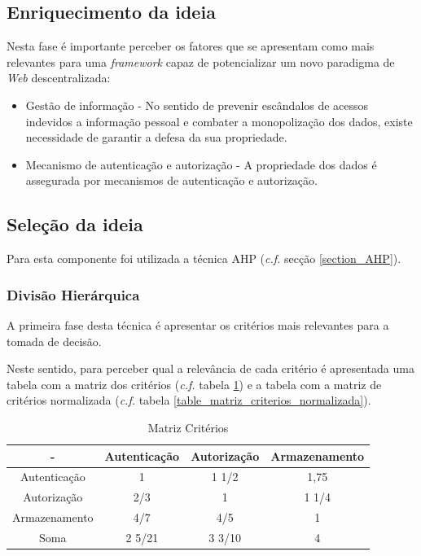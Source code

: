 \subsection{Enriquecimento da ideia}
Nesta fase é importante perceber os fatores que se apresentam como mais relevantes para uma \emph{framework} capaz de potencializar um novo paradigma de \emph{Web} descentralizada:
\begin{itemize}
\item  Gestão de informação - No sentido de prevenir escândalos de acessos indevidos a informação pessoal e combater a monopolização dos dados, existe necessidade de garantir a defesa da sua propriedade.

\item Mecanismo de autenticação e autorização - A propriedade dos dados é assegurada por mecanismos de autenticação e autorização.

\end{itemize}

\subsection{Seleção da ideia}

Para esta componente foi utilizada a técnica \acrshort{AHP} (\emph{c.f.} secção \ref{section_AHP}).

\subsubsection{Divisão Hierárquica}

A primeira fase desta técnica é apresentar os critérios mais relevantes para a tomada de decisão.

Neste sentido, para perceber qual a relevância de cada critério é apresentada uma tabela com a matriz dos critérios (\emph{c.f.} tabela \ref{table_matriz_criterios}) e a tabela com a matriz de critérios normalizada (\emph{c.f.} tabela \ref{table_matriz_criterios_normalizada}).

\begin{table}[h]
\centering
\caption{Matriz Critérios}
\label{table_matriz_criterios}
\vspace{0.5cm}
\begin{tabular}{c|c|c|c} 
 - & Autenticação & Autorização & Armazenamento \\
\hline                          
Autenticação & 1 & 1 1/2 & 1,75 \\
Autorização &  2/3 & 1 & 1 1/4  \\
Armazenamento &  4/7 & 4/5 & 1 \\
Soma & 2 5/21 & 3 3/10 & 4 \\
\end{tabular}
\end{table}

